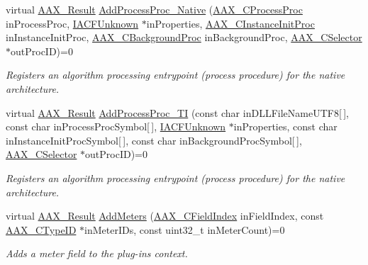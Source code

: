 \begin{DoxyCompactItemize}
virtual \hyperlink{a00149_a4d8f69a697df7f70c3a8e9b8ee130d2f}{A\+A\+X\+\_\+\+Result} \hyperlink{a00050_a4acfd619cfbd35ffd0ff20ca67bda305}{Add\+Process\+Proc\+\_\+\+Native} (\hyperlink{a00163_ad6dd5e1aa5bd2f8462966685e3b26a6e}{A\+A\+X\+\_\+\+C\+Process\+Proc} in\+Process\+Proc, \hyperlink{a00146}{I\+A\+C\+F\+Unknown} $\ast$in\+Properties, \hyperlink{a00163_a3963a850079d3186e08c97a1a4d0ef1c}{A\+A\+X\+\_\+\+C\+Instance\+Init\+Proc} in\+Instance\+Init\+Proc, \hyperlink{a00163_aa64561d963284a3124a0821e7dc79c9a}{A\+A\+X\+\_\+\+C\+Background\+Proc} in\+Background\+Proc, \hyperlink{a00149_aeaf9b387f902c50a8360ff423f4a1f23}{A\+A\+X\+\_\+\+C\+Selector} $\ast$out\+Proc\+I\+D)=0
\begin{DoxyCompactList}\small\item\em Registers an algorithm processing entrypoint (process procedure) for the native architecture. \end{DoxyCompactList}\item 
virtual \hyperlink{a00149_a4d8f69a697df7f70c3a8e9b8ee130d2f}{A\+A\+X\+\_\+\+Result} \hyperlink{a00050_adf549e7f348c670b79bdb5f283798db2}{Add\+Process\+Proc\+\_\+\+T\+I} (const char in\+D\+L\+L\+File\+Name\+U\+T\+F8\mbox{[}$\,$\mbox{]}, const char in\+Process\+Proc\+Symbol\mbox{[}$\,$\mbox{]}, \hyperlink{a00146}{I\+A\+C\+F\+Unknown} $\ast$in\+Properties, const char in\+Instance\+Init\+Proc\+Symbol\mbox{[}$\,$\mbox{]}, const char in\+Background\+Proc\+Symbol\mbox{[}$\,$\mbox{]}, \hyperlink{a00149_aeaf9b387f902c50a8360ff423f4a1f23}{A\+A\+X\+\_\+\+C\+Selector} $\ast$out\+Proc\+I\+D)=0
\begin{DoxyCompactList}\small\item\em Registers an algorithm processing entrypoint (process procedure) for the native architecture. \end{DoxyCompactList}\item 
virtual \hyperlink{a00149_a4d8f69a697df7f70c3a8e9b8ee130d2f}{A\+A\+X\+\_\+\+Result} \hyperlink{a00050_a6b7aec8153fb7243d62284ea504c5681}{Add\+Meters} (\hyperlink{a00149_ae807f8986143820cfb5d6da32165c9c7}{A\+A\+X\+\_\+\+C\+Field\+Index} in\+Field\+Index, const \hyperlink{a00149_ac678f9c1fbcc26315d209f71a147a175}{A\+A\+X\+\_\+\+C\+Type\+I\+D} $\ast$in\+Meter\+I\+Ds, const uint32\+\_\+t in\+Meter\+Count)=0
\begin{DoxyCompactList}\small\item\em Adds a meter field to the plug-\/in\textquotesingle{}s context. \end{DoxyCompactList}\end{DoxyCompactItemize}


